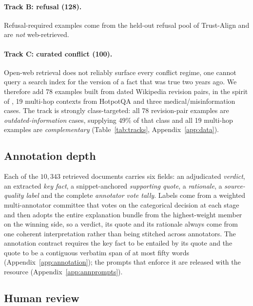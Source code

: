 \paragraph{Track B: refusal (128).} Refusal-required examples come from the
held-out refusal pool of Trust-Align \citep{song2025trustalign} and are
\emph{not} web-retrieved.

\paragraph{Track C: curated conflict (100).} Open-web retrieval does not reliably
surface every conflict regime, one cannot query a search index for the version
of a fact that was true two years ago. We therefore add 78 examples built from
dated Wikipedia revision pairs, in the spirit of \citet{hou2024wikicontradict},
19 multi-hop contexts from HotpotQA \citep{yang2018hotpotqa} and three
medical/misinformation cases. The track is strongly class-targeted: all 78
revision-pair examples are \textit{outdated-information} cases, supplying 49\% of
that class and all 19 multi-hop examples are \textit{complementary}
(Table~\ref{tab:tracks}, Appendix~\ref{app:data}).

\subsection{Annotation depth}

Each of the $10{,}343$ retrieved documents carries six fields: an adjudicated
\textit{verdict}, an extracted \textit{key fact}, a snippet-anchored
\textit{supporting quote}, a \textit{rationale}, a \textit{source-quality label}
and the complete \textit{annotator vote tally}. Labels come from a weighted multi-annotator committee that votes on
the categorical decision at each stage and then adopts the entire explanation
bundle from the highest-weight member on the winning side, so a verdict, its
quote and its rationale always come from one coherent interpretation rather than
being stitched across annotators. The annotation contract requires the key fact
to be entailed by its quote and the quote to be a contiguous verbatim span of at
most fifty words (Appendix~\ref{app:annotation}); the prompts that enforce it are
released with the resource (Appendix~\ref{app:annprompts}).

\subsection{Human review}

